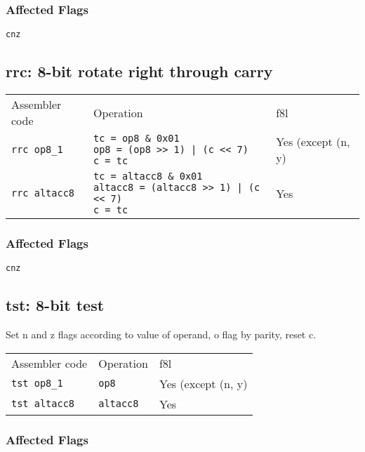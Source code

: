 \documentclass{book}
\begin{document}
\subsubsection*{Affected Flags}

\texttt{cnz}


\subsection{rrc: 8-bit rotate right through carry}

\begin{tabular}{l l l}
Assembler code       & Operation                                                                                               & f8l \\
\texttt{rrc op8\_1}  & \makecell{\texttt{tc = op8  \& 0x01}\\\texttt{op8 = (op8 >> 1) | (c << 7)}\\\texttt{c = tc}}            & Yes (except (n, y) \\
\texttt{rrc altacc8} & \makecell{\texttt{tc = altacc8 \& 0x01}\\\texttt{altacc8 = (altacc8 >> 1) | (c << 7)}\\\texttt{c = tc}} & Yes
\end{tabular}

\subsubsection*{Affected Flags}

\texttt{cnz}


\subsection{tst: 8-bit test}

Set n and z flags according to value of operand, o flag by parity, reset c.

\begin{tabular}{l l l}
Assembler code       & Operation        & f8l \\
\texttt{tst op8\_1}  & \texttt{op8}     & Yes (except (n, y) \\
\texttt{tst altacc8} & \texttt{altacc8} & Yes
\end{tabular}

\subsubsection*{Affected Flags}
\end{document}
